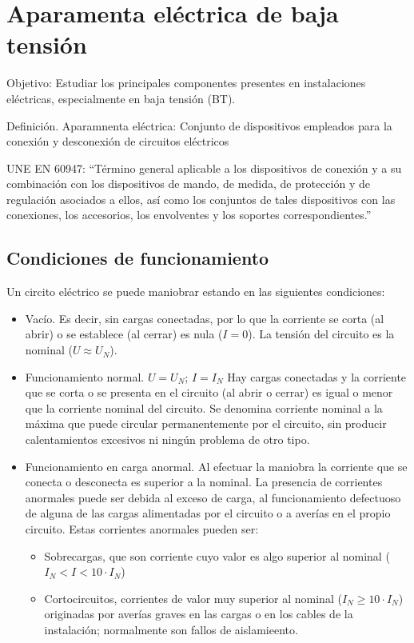 \chapter{Aparamenta eléctrica de baja tensión}

Objetivo: Estudiar los principales componentes presentes en instalaciones eléctricas, especialmente en baja tensión (BT).

Definición. Aparamnenta eléctrica: Conjunto de dispositivos empleados para la conexión y desconexión de circuitos eléctricos

UNE EN 60947: ``Término general aplicable a los dispositivos de conexión y a su combinación con los dispositivos de mando, de medida, de protección y de regulación asociados a ellos, así como los conjuntos de tales dispositivos con las conexiones, los accesorios, los envolventes y los soportes correspondientes.''

\section{Condiciones de funcionamiento}
Un circito eléctrico se puede maniobrar estando en las siguientes condiciones:
\begin{itemize}
    \item Vacío. Es decir, sin cargas conectadas, por lo que la corriente se corta (al abrir) o se establece (al cerrar) es nula ($I = 0$). La tensión del circuito es la nominal ($U \approx U_N$).
    \item Funcionamiento normal. $U = U_N$; $I = I_N$ Hay cargas conectadas y la corriente que se corta o se presenta en el circuito (al abrir o cerrar) es igual o menor que la corriente nominal del circuito. Se denomina corriente nominal a la máxima que puede circular permanentemente por el circuito, sin producir calentamientos excesivos ni ningún problema de otro tipo.
    \item Funcionamiento en carga anormal. Al efectuar la maniobra la corriente que se conecta o desconecta es superior a la nominal. La presencia de corrientes anormales puede ser debida al exceso de carga, al funcionamiento defectuoso de alguna de las cargas alimentadas por el circuito o a averías en el propio circuito. Estas corrientes anormales pueden ser:
    \begin{itemize}
        \item Sobrecargas, que son corriente cuyo valor es algo superior al nominal ($I_N < I < 10 \cdot I_N$)
        \item Cortocircuitos, corrientes de valor muy superior al nominal ($I_N \geq 10 \cdot I_N$) originadas por averías graves en las cargas o en los cables de la instalación; normalmente son fallos de aislamieento.
    \end{itemize}
\end{itemize}

